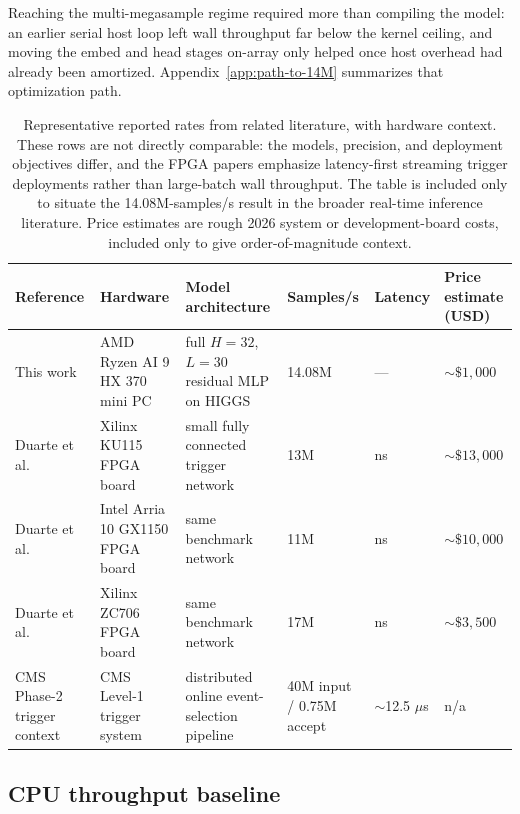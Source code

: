 \documentclass[a4paper,11pt]{article}
\begin{document}
Reaching the multi-megasample regime required more than compiling the model:
an earlier serial host loop left wall throughput far below the kernel ceiling,
and moving the embed and head stages on-array only helped once host overhead
had already been amortized. Appendix~\ref{app:path-to-14M} summarizes that
optimization path.

\begin{table}[t]
\centering
\footnotesize
\begin{tabularx}{\textwidth}{@{}>{\raggedright\arraybackslash}p{}>{\raggedright\arraybackslash}p{}X>{\raggedleft\arraybackslash}p{}>{\raggedleft\arraybackslash}p{}>{\raggedleft\arraybackslash}p{}@{}}
\toprule
Reference & Hardware & Model architecture & Samples/s & Latency & Price estimate (USD) \\
\midrule
This work & AMD Ryzen AI 9 HX 370 mini PC & full $H=32$, $L=30$ residual MLP on HIGGS & 14.08M & --- & \(\sim\$1{,}000\) \\
Duarte et al.~\cite{duarte-fpga} & Xilinx KU115 FPGA board & small fully connected trigger network & 13M & 75 ns & \(\sim\$13{,}000\) \\
Duarte et al.~\cite{duarte-fpga} & Intel Arria 10 GX1150 FPGA board & same benchmark network & 11M & 74 ns & \(\sim\$10{,}000\) \\
Duarte et al.~\cite{duarte-fpga} & Xilinx ZC706 FPGA board & same benchmark network & 17M & 57 ns & \(\sim\$3{,}500\) \\
CMS Phase-2 trigger context~\cite{cms-phase2-l1} & CMS Level-1 trigger system & distributed online event-selection pipeline & 40M input / 0.75M accept & \(\sim\)12.5 \(\mu\)s & n/a \\
\bottomrule
\end{tabularx}
\caption{Representative reported rates from related literature, with hardware
context. These rows are not directly comparable: the models, precision, and
deployment objectives differ, and the FPGA papers emphasize latency-first
streaming trigger deployments rather than large-batch wall throughput. The
table is included only to situate the 14.08M-samples/s result in the broader
real-time inference literature. Price estimates are rough 2026 system or
development-board costs, included only to give order-of-magnitude context.}
\label{tab:related-throughput}
\end{table}

\subsection{CPU throughput baseline}
\end{document}
